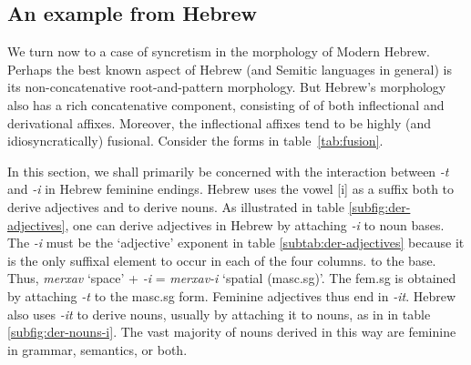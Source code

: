 \subsection{An example from Hebrew}
\label{sec:heb-example}
We turn now to a case of syncretism in the morphology of Modern Hebrew. Perhaps
the best known aspect of Hebrew (and Semitic languages in general) is its non-concatenative root-and-pattern morphology. But 
Hebrew's morphology also has a rich concatenative component, consisting of
of both inflectional and derivational affixes. Moreover, the inflectional affixes tend to be
highly (and idiosyncratically) fusional.  %
Consider the forms in table~\ref{tab:fusion}. 


In this section, we shall primarily be concerned with the
interaction between \textit{-t} and \textit{-i} in Hebrew feminine endings.
Hebrew uses the vowel [i] 
as a suffix both to derive adjectives and to derive nouns.
As illustrated in table \ref{subfig:der-adjectives}, one can derive adjectives 
in Hebrew by attaching \textit{-i} to noun bases. The \textit{-i} must be the `adjective' exponent
in table \ref{subtab:der-adjectives} because it is the only suffixal element to occur in each
of the four columns. %
to the base. Thus, \textit{merxav} `space' + \textit{-i} = \textit{merxav-i} 
`spatial (masc.sg)'. The fem.sg is obtained by attaching \textit{-t} to the masc.sg
form. Feminine adjectives thus end in \textit{-it}. 
Hebrew also uses \textit{-it} to derive nouns, usually by attaching it to nouns, as in in table \ref{subfig:der-nouns-i}. 
The vast majority of nouns derived in this way are feminine in grammar, semantics, or both. 



